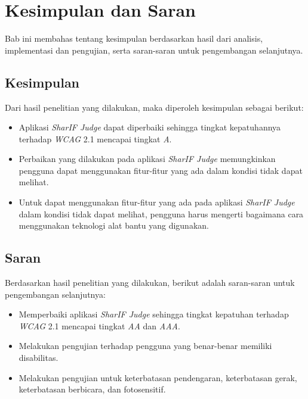 \chapter{Kesimpulan dan Saran}
\label{chap:kesimpulan_dan_saran}

Bab ini membahas tentang kesimpulan berdasarkan hasil dari analisis, implementasi dan pengujian, serta saran-saran untuk pengembangan selanjutnya.

\section{Kesimpulan}
\label{sec:kesimpulan}
Dari hasil penelitian yang dilakukan, maka diperoleh kesimpulan sebagai berikut:
\begin{itemize}
	\item Aplikasi \textit{SharIF Judge} dapat diperbaiki sehingga tingkat kepatuhannya terhadap \textit{WCAG} 2.1 mencapai tingkat \textit{A}.
	\item Perbaikan yang dilakukan pada aplikasi \textit{SharIF Judge} memungkinkan pengguna dapat menggunakan fitur-fitur yang ada dalam kondisi tidak dapat melihat.
	\item Untuk dapat menggunakan fitur-fitur yang ada pada aplikasi \textit{SharIF Judge} dalam kondisi tidak dapat melihat, pengguna harus mengerti bagaimana cara menggunakan teknologi alat bantu yang digunakan.
\end{itemize}

\section{Saran}
\label{sec:saran}
Berdasarkan hasil penelitian yang dilakukan, berikut adalah saran-saran untuk pengembangan selanjutnya:
\begin{itemize}
	\item Memperbaiki aplikasi \textit{SharIF Judge} sehingga tingkat kepatuhan terhadap \textit{WCAG} 2.1 mencapai tingkat \textit{AA} dan \textit{AAA}.
	\item Melakukan pengujian terhadap pengguna yang benar-benar memiliki disabilitas.
	\item Melakukan pengujian untuk keterbatasan pendengaran, keterbatasan gerak, keterbatasan berbicara, dan fotosensitif.
\end{itemize}